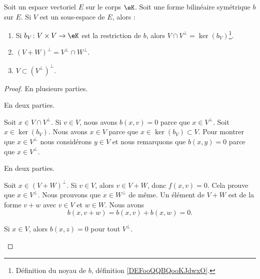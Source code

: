 \begin{proposition}		\label{PROPooSACFooQTsiJL}
	Soit un espace vectoriel \( E\) sur le corps \( \eK\). Soit une forme bilinéaire symétrique \( b\) sur \( E\). Si \( V\) est un sous-espace de \( E\), alors :
	\begin{enumerate}
		\item		\label{ITEMooYHJUooQnbKQc}
		      Si \(b_V \colon V\times V\to \eK  \) est la restriction de \( b\), alors \(  V\cap V^{\perp}=\ker(b_V)\)\footnote{Définition du noyau de \( b\), définition \ref{DEFooQQBQooKJdwxO}.}.
		\item		\label{ITEMooUZZFooDbuddF}
		      \( (V+W)^{\perp}=V^{\perp}\cap W^{\perp}\).
		\item	\label{ITEMooSZAGooLgkzYw}
		      \( V\subset (V^{\perp})^{\perp}\).
	\end{enumerate}
\end{proposition}

\begin{proof}
	En plusieurs parties.
	\begin{subproof}

		En deux parties.
		\begin{subproof}
			Soit \( x\in V\cap V^{\perp}\). Si \( v\in V\), nous avons \( b(x,v)=0\) parce que \( x\in V^{\perp}\).
			Soit \( x\in\ker(b_V)\). Nous avons \( x\in V\) parce que \( x\in \ker(b_V)\subset V\). Pour montrer que \( x\in V^{\perp}\) nous considérons \( y\in V\) et nous remarquons que \( b(x,y)=0\) parce que \( x\in V^{\perp}\).

		\end{subproof}
		\spitem[Pour \ref{ITEMooUZZFooDbuddF}]
		En deux parties.
		\begin{subproof}
			\spitem[\( (V+W)^{\perp}\subset V^{\perp}\cap W^{\perp}\)]
			Soit \( x\in (V+W)^{\perp}\). Si \( v\in V\), alors \( v\in V+W\), donc \( f(x,v)=0\). Cela prouve que \( x\in V^{\perp}\). Nous prouvons que \( x\in W^{\perp}\) de même.
			\spitem[\(  V^{\perp}\cap W^{\perp} \subset  (V+W)^{\perp}\)]
			Un élément de \( V+W\) est de la forme \( v+w\) avec \( v\in V\) et \( w\in W\). Nous avons
			\begin{equation}
				b(x,v+w)=b(x,v)+b(x,w)=0.
			\end{equation}
		\end{subproof}
		\spitem[Pour \ref{ITEMooSZAGooLgkzYw}]
		Si \( x\in V\), alors \( b(x,z)=0\) pour tout \( V^{\perp}\).
	\end{subproof}
\end{proof}

